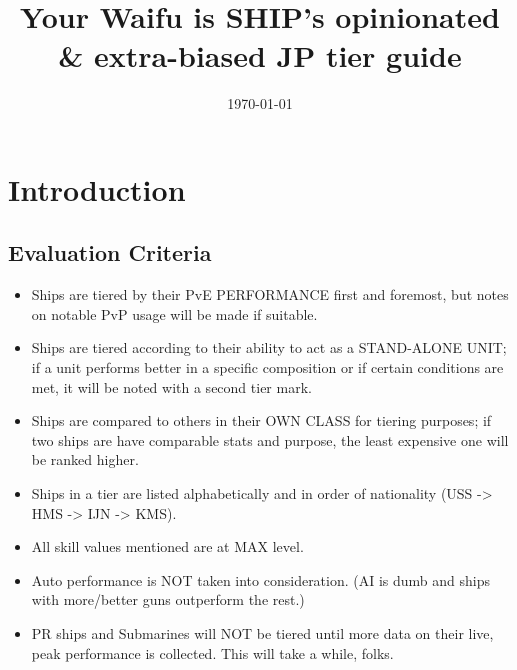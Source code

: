 \newcommand{\game}{Azur Lane JP}
\title{Your Waifu is SHIP's opinionated \& extra-biased JP tier guide}
\newcommand{\subtitle}{based on Kopfjäger's work}
\date{\today}

\customtitle
\tableofcontents
\newpage
\pagestyle{intro}

\section{Introduction}
\subsection{Evaluation Criteria}
\begin{itemize}
\item Ships are tiered by their PvE PERFORMANCE first and foremost, but notes on notable PvP usage will be made if suitable.
\item Ships are tiered according to their ability to act as a STAND-ALONE UNIT; if a unit performs better in a specific composition or if certain conditions are met, it will be noted with a second tier mark.
\item Ships are compared to others in their OWN CLASS for tiering purposes; if two ships are have comparable stats and purpose, the least expensive one will be ranked higher.
\item Ships in a tier are listed alphabetically and in order of nationality (USS -> HMS -> IJN -> KMS).
\item All skill values mentioned are at MAX level.
\item Auto performance is NOT taken into consideration. (AI is dumb and ships with more/better guns outperform the rest.)
\item PR ships and Submarines will NOT be tiered until more data on their live, peak performance is collected. This will take a while, folks.
\end{itemize}
 

